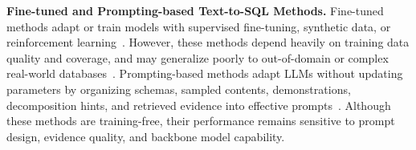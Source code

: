 %
%

\textbf{Fine-tuned and Prompting-based Text-to-SQL Methods.}
Fine-tuned methods adapt or train models with supervised fine-tuning, synthetic data, or reinforcement learning~\cite{sun2023sqlpalm,li2024codes,pourreza2024dtssql,chen2024opensql,thorpe2024dubo,ma2025sqlr1,liu2025xiyansql,li2025omnisql,pourreza2025reasoningsql,yao2025arctictext2sql}.
However, these methods depend heavily on training data quality and coverage, and may generalize poorly to out-of-domain or complex real-world databases~\cite{li2026deepeye}.
Prompting-based methods adapt LLMs without updating parameters by organizing schemas, sampled contents, demonstrations, decomposition hints, and retrieved evidence into effective prompts~\cite{gao2023text,li2023can,sun2023sqlpalm,pourreza2023din,xie2025opensearchsql,ramachandran2024textsqlcalibration,talaei2024chess,pourreza2024chasesql,wang2025linkalign,maamari2024death}.
Although these methods are training-free, their performance remains sensitive to prompt design, evidence quality, and backbone model capability.

